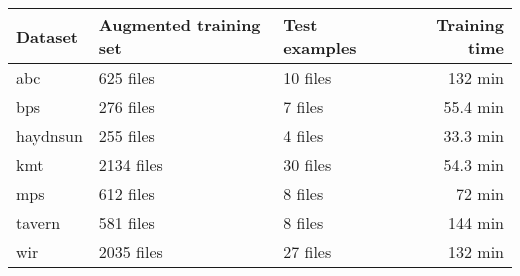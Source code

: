 \begin{tabular}{l|llr}
Dataset        & Augmented training set & Test examples & Training time \\ \hline
\gls{abc}      & 625   files                 & 10 files            & 132 min          \\
\gls{bps}      & 276   files                 & 7  files            & 55.4 min      \\
\gls{haydnsun} & 255   files                 & 4  files            & 33.3 min      \\
\gls{kmt}      & 2134  files                 & 30 files            & 54.3 min      \\
\gls{mps}      & 612   files                 & 8  files            & 72 min          \\
\gls{tavern}   & 581   files                 & 8  files            & 144 min          \\
\gls{wir}      & 2035  files                 & 27 files            & 132 min         
\end{tabular}
